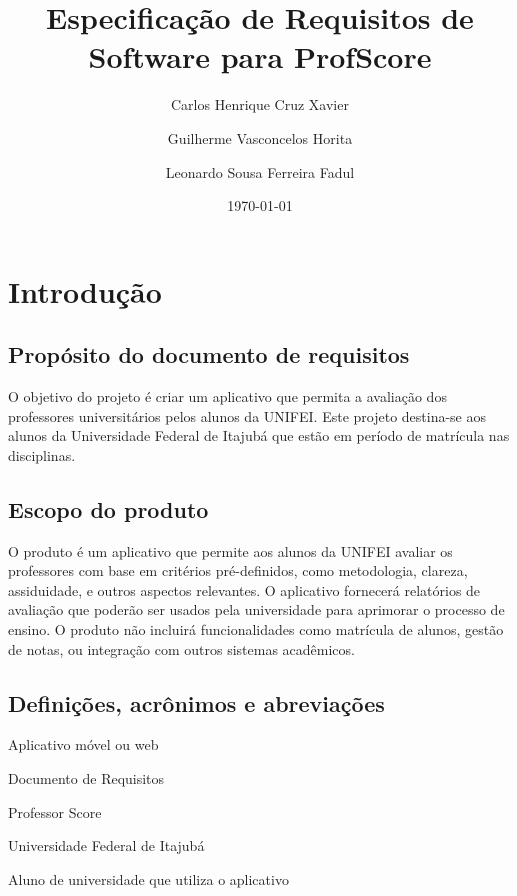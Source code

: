 \documentclass[12pt]{article}
\title{Especificação de Requisitos de Software para ProfScore}
\author{Carlos Henrique Cruz Xavier 
  \and Guilherme Vasconcelos Horita
  \and Leonardo Sousa Ferreira Fadul
}
\date{\today}
\begin{document}
\maketitle

\section{Introdução}

  \subsection{Propósito do documento de requisitos}

  O objetivo do projeto é criar um aplicativo que permita a avaliação dos professores universitários pelos alunos da UNIFEI.
  Este projeto destina-se aos alunos da Universidade Federal de Itajubá que estão em período de matrícula nas disciplinas.

  \subsection{Escopo do produto}

  O produto é um aplicativo que permite aos alunos da UNIFEI avaliar os professores com base em critérios pré-definidos, como metodologia, clareza, assiduidade, e outros aspectos relevantes.
  O aplicativo fornecerá relatórios de avaliação que poderão ser usados pela universidade para aprimorar o processo de ensino.
  O produto não incluirá funcionalidades como matrícula de alunos, gestão de notas, ou integração com outros sistemas acadêmicos.

  \subsection{Definições, acrônimos e abreviações}

  \begin{description}[leftmargin=*, widest=DCCHTM]
    
    \item[App]
    Aplicativo móvel ou web
    
    \item[DR]
    Documento de Requisitos

    \item[ProfScore]
    Professor Score
    
    \item[UNIFEI]
    Universidade Federal de Itajubá

    \item[Usuário]
    Aluno de universidade que utiliza o aplicativo

  \end{description}
\end{document}
